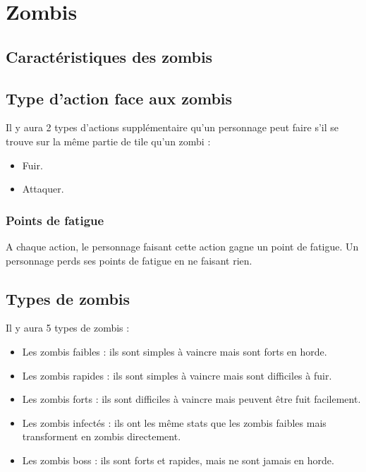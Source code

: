 \section{Zombis}
\subsection{Caractéristiques des zombis}
\subsection{Type d'action face aux zombis}
Il y aura 2 types d'actions supplémentaire qu'un personnage peut faire s'il se trouve sur la même partie de tile qu'un zombi :
\begin{itemize}
  \item Fuir.
  \item Attaquer.
\end{itemize}
\subsubsection{Points de fatigue}
A chaque action, le personnage faisant cette action gagne un point de fatigue.
Un personnage perds ses points de fatigue en ne faisant rien.
\subsection{Types de zombis}
Il y aura 5 types de zombis :
\begin{itemize}
  \item Les zombis faibles : ils sont simples à vaincre mais sont forts en horde.
  \item Les zombis rapides : ils sont simples à vaincre mais sont difficiles à fuir.
  \item Les zombis forts : ils sont difficiles à vaincre mais peuvent être fuit facilement.
  \item Les zombis infectés : ils ont les même stats que les zombis faibles mais transforment en zombis directement.
  \item Les zombis boss : ils sont forts et rapides, mais ne sont jamais en horde.
\end{itemize}
